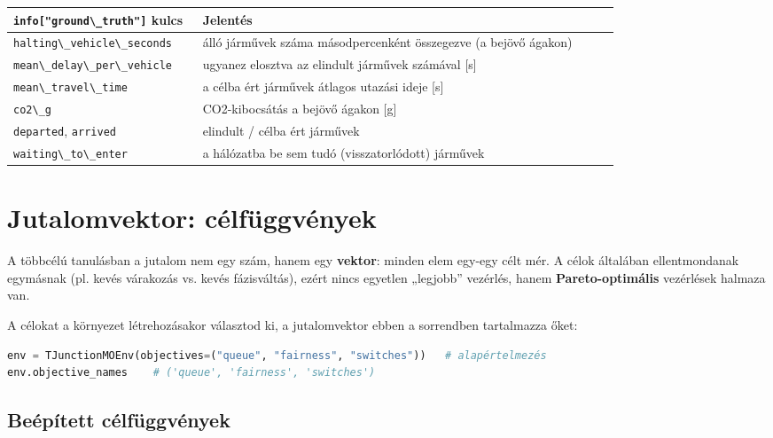 \begin{longtable}[]{@{}>{\raggedright\arraybackslash}p{0.30\linewidth}>{\raggedright\arraybackslash}p{0.66\linewidth}@{}}
\toprule\noalign{}
\passthrough{\lstinline!info["ground\_truth"]!}
kulcs & Jelentés \\
\midrule\noalign{}
\endhead
\bottomrule\noalign{}
\endlastfoot
\passthrough{\lstinline!halting\_vehicle\_seconds!}
& álló járművek száma másodpercenként
összegezve (a bejövő ágakon) \\
\passthrough{\lstinline!mean\_delay\_per\_vehicle!}
& ugyanez elosztva az elindult járművek
számával {[}s{]} \\
\passthrough{\lstinline!mean\_travel\_time!}
& a célba ért járművek átlagos utazási
ideje {[}s{]} \\
\passthrough{\lstinline!co2\_g!} &
CO2-kibocsátás a bejövő ágakon
{[}g{]} \\
\passthrough{\lstinline!departed!},
\passthrough{\lstinline!arrived!} &
elindult / célba ért járművek \\
\passthrough{\lstinline!waiting\_to\_enter!}
& a hálózatba be sem tudó
(visszatorlódott) járművek \\
\end{longtable}


\hypertarget{jutalomvektor-cuxe9lfuxfcggvuxe9nyek}{%
\section{Jutalomvektor:
célfüggvények}\label{jutalomvektor-cuxe9lfuxfcggvuxe9nyek}}

A többcélú tanulásban a jutalom nem egy
szám, hanem egy \textbf{vektor}: minden
elem egy-egy célt mér. A célok általában
ellentmondanak egymásnak (pl. kevés
várakozás vs. kevés fázisváltás), ezért
nincs egyetlen „legjobb'' vezérlés,
hanem \textbf{Pareto-optimális}
vezérlések halmaza van.

A célokat a környezet létrehozásakor
választod ki, a jutalomvektor ebben a
sorrendben tartalmazza őket:

\begin{lstlisting}[language=Python]
env = TJunctionMOEnv(objectives=("queue", "fairness", "switches"))   # alapértelmezés
env.objective_names    # ('queue', 'fairness', 'switches')
\end{lstlisting}

\hypertarget{beuxe9puxedtett-cuxe9lfuxfcggvuxe9nyek}{%
\subsection{Beépített
célfüggvények}\label{beuxe9puxedtett-cuxe9lfuxfcggvuxe9nyek}}

